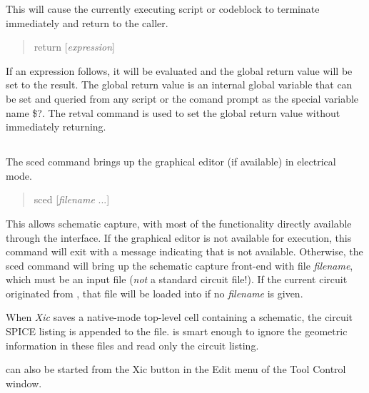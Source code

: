 
This will cause the currently executing script or codeblock to
terminate immediately and return to the caller.
\begin{quote}\vt
return [{\it expression\/}]
\end{quote}
If an expression follows, it will be evaluated and the global return
value will be set to the result.  The global return value is an
internal global variable that can be set and queried from any script
or the comand prompt as the special variable name {\vt \$?}.  The {\cb
retval} command is used to set the global return value without
immediately returning.


\subsection{}


The {\cb sced} command brings up the {\Xic} graphical editor (if
available) in electrical mode.
\begin{quote}\vt
sced [{\it filename} ...]
\end{quote}
This allows schematic capture, with most of the {\WRspice}
functionality directly available through the {\Xic} interface.  If the
{\Xic} graphical editor is not available for execution, this command
will exit with a message indicating that {\Xic} is not available. 
Otherwise, the {\cb sced} command will bring up the schematic capture
front-end with file {\it filename\/}, which must be an {\Xic} input
file ({\it not} a standard {\WRspice} circuit file!).  If the current
circuit originated from {\Xic}, that file will be loaded into {\Xic}
if no {\it filename} is given. 

When {\it Xic} saves a native-mode top-level cell containing a
schematic, the circuit SPICE listing is appended to the file. 
{\WRspice} is smart enough to ignore the geometric information in
these files and read only the circuit listing.

{\Xic} can also be started from the {\cb Xic} button in the {\cb Edit}
menu of the {\cb Tool Control} window.

\subsection{}

